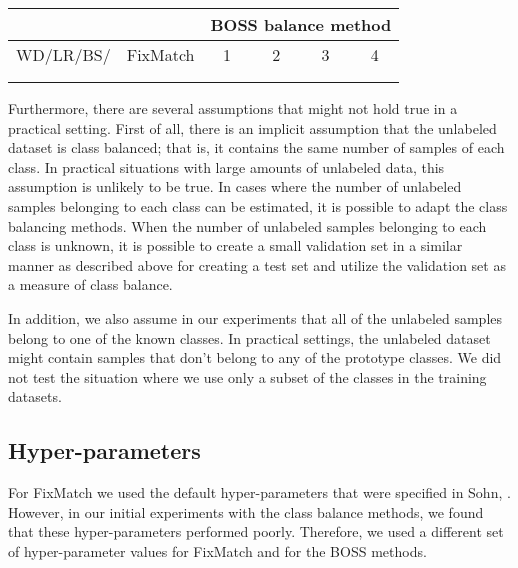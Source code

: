 \documentclass[final]{cvpr}
\newcommand{\HP}{hyper-parameter }
\begin{document}
\begin{table*}
	\begin{center}
		\begin{tabular}{|c|c|c|c|c|c|}
			\hline
			&  & \multicolumn{4}{|c|}{BOSS balance method}    \\
			\hline
			WD/LR/BS/ & FixMatch & 1 & 2 & 3 & 4     \\
			\hline\hline
			 &  &   &    &   &    \\
			\hline
 &  &   &    &   &    \\
			\hline
			
			
		\end{tabular}
	\end{center}
	\caption{Test accuracies for class prototype set 2 for two  hyper-parameter settings. The hyper-parameters are weight decay (WD), learning rate (LR), batch size (BS), and the ratio of the unlabeled to labeled data ().
	}
	\label{tab:set2HP}
\end{table*}



Furthermore, there are several assumptions that might not hold true in a practical setting.
First of all, there is an implicit assumption that the unlabeled dataset is class balanced; that is, it contains the same number of samples of each class.
In practical situations with large amounts of unlabeled data, this assumption is unlikely to be true.
In cases where the number of unlabeled samples belonging to each class can be estimated, it is possible to adapt the class balancing methods.
When the number of unlabeled samples belonging to each class is unknown, it is possible to create a small validation set in a similar manner as described above for creating a test set and utilize the validation set as a measure of class balance.

In addition, we also assume in our experiments that all of the unlabeled samples belong to one of the known classes.
In practical settings, the unlabeled dataset might contain samples that don't belong to any of the prototype classes.
We did not test the situation where we use only a subset of the classes in the training datasets.


\subsection{Hyper-parameters}
\label{sec:expHP}

For FixMatch we used the default hyper-parameters that were specified in Sohn, \etal \cite{sohn2020fixmatch}.
However, in our initial experiments with the class balance methods, we found that these hyper-parameters performed poorly.
Therefore, we used a different set of \HP values for FixMatch and for the BOSS methods.
\end{document}
